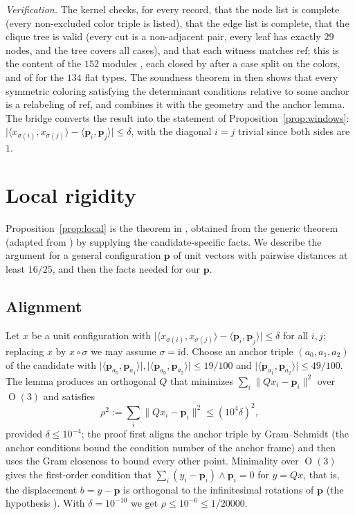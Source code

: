 \documentclass[11pt]{amsart}
\theoremstyle{definition}
\theoremstyle{remark}
\newcommand{\ip}[2]{\langle #1,#2\rangle}
\newcommand{\norm}[1]{\lVert #1\rVert}
\newcommand{\abs}[1]{\lvert #1\rvert}
\newcommand{\cand}{\mathbf{p}}
\DeclareMathOperator{\OO}{O}
\begin{document}
\emph{Verification.} The kernel checks, for every record, that the node list is complete (every non-excluded color triple is listed), that the edge list is complete, that the clique tree is valid (every cut is a non-adjacent pair, every leaf has exactly $29$ nodes, and the tree covers all cases), and that each witness matches $\mathrm{ref}$; this is the content of the $152$ modules , each closed by  after a case split on the colors, and of  for the $134$ flat types. The soundness theorem  in  then shows that every symmetric coloring satisfying the determinant conditions relative to some anchor is a relabeling of $\mathrm{ref}$, and  combines it with the geometry and the anchor lemma. The bridge  converts the result into the statement of Proposition~\ref{prop:windows}: $\abs{\ip{x_{\sigma(i)}}{x_{\sigma(j)}}-\ip{\cand_i}{\cand_j}}\le\delta$, with the diagonal $i=j$ trivial since both sides are $1$.

\section{Local rigidity}\label{sec:local}

Proposition~\ref{prop:local} is the theorem  in , obtained from the generic theorem  (adapted from \cite{ThomsonN9}) by supplying the candidate-specific facts. We describe the argument for a general configuration $\cand$ of unit vectors with pairwise distances at least $16/25$, and then the facts needed for our $\cand$.

\subsection{Alignment}

Let $x$ be a unit configuration with $\abs{\ip{x_{\sigma(i)}}{x_{\sigma(j)}}-\ip{\cand_i}{\cand_j}}\le\delta$ for all $i,j$; replacing $x$ by $x\circ\sigma$ we may assume $\sigma=\mathrm{id}$. Choose an anchor triple $(a_0,a_1,a_2)$ of the candidate with $\abs{\ip{\cand_{a_0}}{\cand_{a_1}}},\abs{\ip{\cand_{a_0}}{\cand_{a_2}}}\le19/100$ and $\abs{\ip{\cand_{a_1}}{\cand_{a_2}}}\le49/100$. The lemma  produces an orthogonal $Q$ that minimizes $\sum_i\norm{Q x_i-\cand_i}^{2}$ over $\OO(3)$ and satisfies
\[
  \rho^{2}:=\sum_{i}\norm{Qx_i-\cand_i}^{2}\le(10^{4}\delta)^{2},
\]
provided $\delta\le10^{-4}$; the proof first aligns the anchor triple by Gram--Schmidt (the anchor conditions bound the condition number of the anchor frame) and then uses the Gram closeness to bound every other point. Minimality over $\OO(3)$ gives the first-order condition that $\sum_i (y_i-\cand_i)\wedge\cand_i=0$ for $y=Qx$, that is, the displacement $b=y-\cand$ is orthogonal to the infinitesimal rotations of $\cand$ (the hypothesis ). With $\delta=10^{-10}$ we get $\rho\le10^{-6}\le1/20000$.
\end{document}
